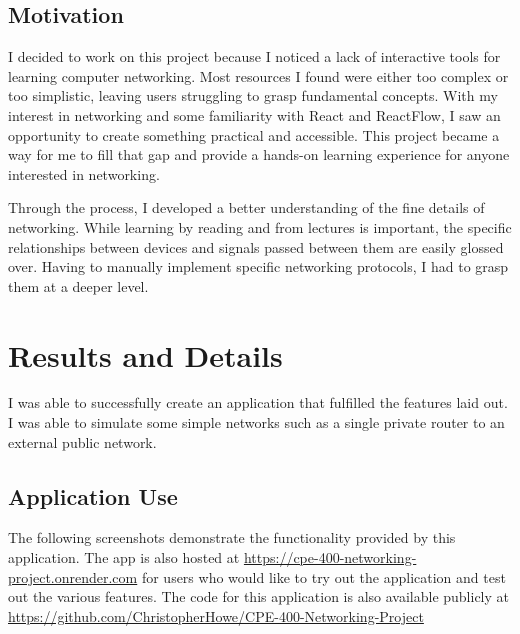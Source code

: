 \documentclass{assignment-x}
\begin{document}
\subsection{Motivation}
I decided to work on this project because I noticed a lack of interactive tools for learning computer networking. Most resources I found were either too complex or too simplistic, leaving users struggling to grasp fundamental concepts. With my interest in networking and some familiarity with React and ReactFlow, I saw an opportunity to create something practical and accessible. This project became a way for me to fill that gap and provide a hands-on learning experience for anyone interested in networking.

Through the process, I developed a better understanding of the fine details of networking. While learning by reading and from lectures is important, the specific relationships between devices and signals passed between them are easily glossed over. Having to manually implement specific networking protocols, I had to grasp them at a deeper level.

\section{Results and Details}
I was able to successfully create an application that fulfilled the features laid out.
I was able to simulate some simple networks such as a single private router to an external public network.

\subsection{Application Use}
The following screenshots demonstrate the functionality provided by this application. The app is also hosted at \url{https://cpe-400-networking-project.onrender.com} for users who would like to try out the application and test out the various features. The code for this application is also available publicly at \url{https://github.com/ChristopherHowe/CPE-400-Networking-Project}

\begin{minipage}{0.48\linewidth}
\end{minipage}
\begin{minipage}{0.48\linewidth}
\end{minipage}
\begin{minipage}{0.48\linewidth}
\end{minipage}
\begin{minipage}{0.48\linewidth}
\end{minipage}
\end{document}
